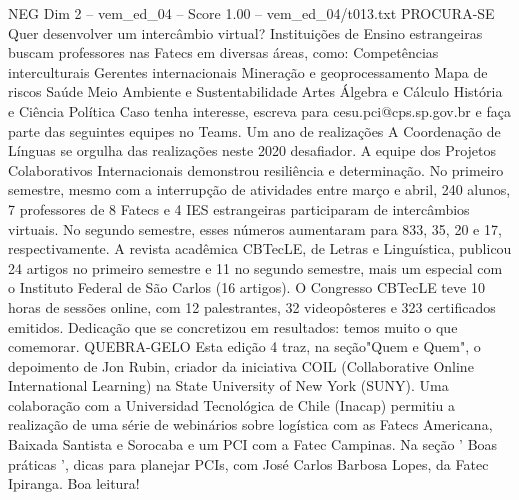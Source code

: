 \begin{textsample}{NEG Dim 2 – vem\_ed\_04 – Score 1.00 – vem\_ed\_04/t013.txt}  \label{ex:f2_neg_041}
PROCURA-SE Quer desenvolver um intercâmbio virtual?
Instituições de Ensino estrangeiras buscam professores nas Fatecs em diversas áreas, como: Competências interculturais Gerentes internacionais Mineração e geoprocessamento Mapa de riscos Saúde Meio Ambiente e Sustentabilidade Artes Álgebra e Cálculo História e Ciência Política Caso tenha interesse, escreva para cesu.pci@cps.sp.gov.br e faça parte das seguintes equipes no Teams.
Um ano de realizações A Coordenação de Línguas se orgulha das realizações neste 2020 desafiador.
A equipe dos Projetos Colaborativos Internacionais demonstrou resiliência e determinação.
No primeiro semestre, mesmo com a interrupção de atividades entre março e abril, 240 alunos, 7 professores de 8 Fatecs e 4 IES estrangeiras participaram de intercâmbios virtuais.
No segundo semestre, esses números aumentaram para 833, 35, 20 e 17, respectivamente.
A revista acadêmica CBTecLE, de Letras e Linguística, publicou 24 artigos no primeiro semestre e 11 no segundo semestre, mais um especial com o Instituto Federal de São Carlos (16 artigos).
O Congresso CBTecLE teve 10 horas de sessões online, com 12 palestrantes, 32 videopôsteres e 323 certificados emitidos.
Dedicação que se concretizou em resultados: temos muito o que comemorar.
QUEBRA-GELO Esta edição 4 traz, na seção"Quem e Quem", o depoimento de Jon Rubin, criador da iniciativa COIL (Collaborative Online International Learning) na State University of New York (SUNY).
Uma colaboração com a Universidad Tecnológica de Chile (Inacap) permitiu a realização de uma série de webinários sobre logística com as Fatecs Americana, Baixada Santista e Sorocaba e um PCI com a Fatec Campinas.
Na seção ' Boas práticas ', dicas para planejar PCIs, com José Carlos Barbosa Lopes, da Fatec Ipiranga.
Boa leitura!

\end{textsample}
